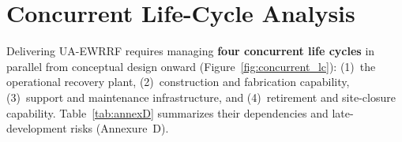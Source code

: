\section{Concurrent Life-Cycle Analysis}
\label{sec:D}

Delivering UA-EWRRF requires managing \textbf{four concurrent life cycles} in parallel from conceptual design onward (Figure~\ref{fig:concurrent_lc}): (1)~the operational recovery plant, (2)~construction and fabrication capability, (3)~support and maintenance infrastructure, and (4)~retirement and site-closure capability. Table~\ref{tab:annexD} summarizes their dependencies and late-development risks (Annexure~D).



